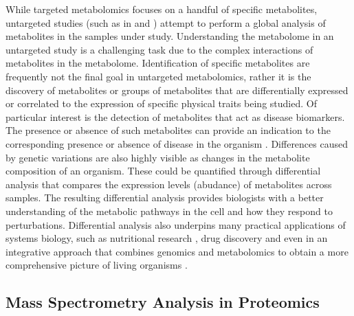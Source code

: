 While targeted metabolomics focuses on a handful of specific metabolites, untargeted studies (such as in \cite{DeVos2007a} and \cite{Creek2011}) attempt to perform a global analysis of metabolites in the samples under study. Understanding the metabolome in an untargeted study is a challenging task due to the complex interactions of metabolites in the metabolome. Identification of specific metabolites are frequently not the final goal in untargeted metabolomics, rather it is the discovery of metabolites or groups of metabolites that are differentially expressed or correlated to the expression of specific physical traits being studied. Of particular interest is the detection of metabolites that act as disease biomarkers. The presence or absence of such metabolites can provide an indication to the corresponding presence or absence of disease in the organism \cite{mamas2011role}. Differences caused by genetic variations are also highly visible as changes in the metabolite composition of an organism. These could be quantified through differential analysis that compares the expression levels (abudance) of metabolites across samples. The resulting differential analysis provides biologists with a better understanding of the metabolic pathways in the cell and how they respond to perturbations. Differential analysis also underpins many practical applications of systems biology, such as nutritional research \cite{Gibney2005}, drug discovery \cite{Kell2006} and even in an integrative approach that combines genomics and metabolomics to obtain a more comprehensive picture of living organisms \cite{Gieger2008}. 


\subsection{Mass Spectrometry Analysis in Proteomics}

